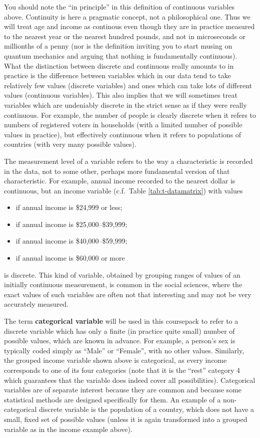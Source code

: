 \documentclass[11pt,a4paper,openany]{book}
\begin{document}
You should note the ``in principle'' in this definition of continuous
variables above. Continuity is here a pragmatic concept, not a
philosophical one. Thus we will treat age and income as continous even
though they are in practice measured to the nearest year or the nearest
hundred pounds, and not in microseconds or millionths of a penny (nor is
the definition inviting you to start musing on quantum mechanics and
arguing that nothing is fundamentally continuous). What the distinction
between discrete and continuous really amounts to in practice is the
difference between variables which in our data tend to take relatively
few values (discrete variables) and ones which can take lots of
different values (continuous variables). This also implies that we will
sometimes treat variables which are undeniably discrete in the strict
sense as if they were really continuous. For example, the number of
people is clearly discrete when it refers to numbers of registered
voters in households (with a limited number of possible values in
practice), but effectively continuous when it refers to populations of
countries (with very many possible values).

The measurement level of a variable refers to the way a characteristic
is recorded in the data, not to some other, perhaps more fundamental
version of that characteristic. For example, annual income recorded to
the nearest dollar is continuous, but an income variable (c.f.~Table
\ref{tab:t-datamatrix}) with values

\begin{itemize}
\item
  if annual income is \$24,999 or less;
\item
  if annual income is \$25,000--\$39,999;
\item
  if annual income is \$40,000--\$59,999;
\item
  if annual income is \$60,000 or more
\end{itemize}

is discrete. This kind of variable, obtained by grouping ranges of
values of an initially continuous measurement, is common in the social
sciences, where the exact values of such variables are often not that
interesting and may not be very accurately measured.

The term \textbf{categorical variable} will be used in this coursepack
to refer to a discrete variable which has only a finite (in practice
quite small) number of possible values, which are known in advance. For
example, a person's sex is typically coded simply as ``Male'' or
``Female'', with no other values. Similarly, the grouped income variable
shown above is categorical, as every income corresponds to one of its
four categories (note that it is the ``rest'' category 4 which
guarantees that the variable does indeed cover all possibilities).
Categorical variables are of separate interest because they are common
and because some statistical methods are designed specifically for them.
An example of a non-categorical discrete variable is the population of a
country, which does not have a small, fixed set of possible values
(unless it is again transformed into a grouped variable as in the income
example above).
\end{document}
